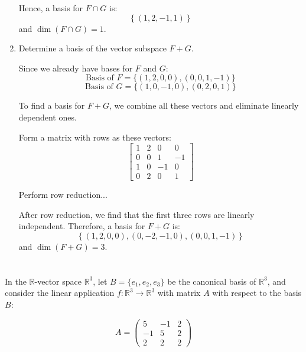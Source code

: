 \documentclass[12pt]{article}
\begin{document}
\begin{answerbox}
\begin{enumerate}
      Hence, a basis for $ F \cap G $ is:
      $$
      \left\{(1, 2, -1, 1)\right\}
      $$
      and $\dim(F \cap G) = 1$.

  \item Determine a basis of the vector subspace $ F + G $.

      Since we already have bases for $ F $ and $ G $:
      $$
      \text{Basis of } F = \{(1, 2, 0, 0), (0, 0, 1, -1)\}
      $$
      $$
      \text{Basis of } G = \{(1, 0, -1, 0), (0, 2, 0, 1)\}
      $$

      To find a basis for $ F + G $, we combine all these vectors and eliminate linearly dependent ones.

      Form a matrix with rows as these vectors:
      $$
      \begin{bmatrix}
      1 & 2 & 0 & 0 \\
      0 & 0 & 1 & -1 \\
      1 & 0 & -1 & 0 \\
      0 & 2 & 0 & 1
      \end{bmatrix}
      $$

      Perform row reduction...

      After row reduction, we find that the first three rows are linearly independent. Therefore, a basis for $ F + G $ is:
      $$
      \left\{(1, 2, 0, 0), (0, -2, -1, 0), (0, 0, 1, -1)\right\}
      $$
      and $\dim(F + G) = 3$.
\end{enumerate}
\end{answerbox}

\newpage

\section{}
In the $\mathbb{R}$-vector space $\mathbb{R}^3$, let $B = \{e_1, e_2, e_3\}$ be the canonical basis of $\mathbb{R}^3$, and consider the linear application $f : \mathbb{R}^3 \to \mathbb{R}^3$ with matrix $A$ with respect to the basis $B$:

\[A = \begin{pmatrix} 5 & -1 & 2 \\ -1 & 5 & 2 \\ 2 & 2 & 2 \end{pmatrix}\]
\end{document}
